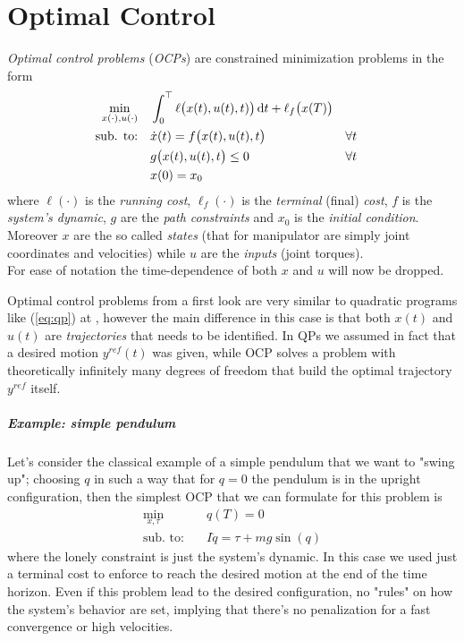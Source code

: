 \chapter{Optimal Control}
	\textit{Optimal control problems} (\textit{OCPs}) are constrained minimization problems in the form
	\begin{equation} \label{eq:ocpstatement}
	\begin{aligned}
		\min_{x(\cdot), u(\cdot)} \quad & \int_0^\top  \ell\big(x(t), u(t), t)\big) \, \mathrm{d} t + \ell_f\big(x(T)\big) \\
		\textrm{sub. to:} \quad & \dot x(t) = f\big(x(t), u(t), t\big) && \forall t \\
		& g\big(x(t), u(t), t\big) \leq 0 && \forall t \\
		& x(0) = x_0 
	\end{aligned}
	\end{equation}
	where $\ell(\cdot)$ is the \textit{running cost}, $\ell_f(\cdot)$ is the \textit{terminal} (final) \textit{cost}, $f$ is the \textit{system's dynamic}, $g$ are the \textit{path constraints} and $x_0$ is the \textit{initial condition}. Moreover $x$ are the so called \textit{states} (that for manipulator are simply joint coordinates and velocities) while $u$ are the \textit{inputs} (joint torques). \\
	For ease of notation the time-dependence of both $x$ and $u$ will now be dropped.
	
	Optimal control problems from a first look are very similar to quadratic programs like (\ref{eq:qp}) at \pageref{eq:qp}, however the main difference in this case is that both $x(t)$ and $u(t)$ are \textit{trajectories} that needs to be identified. In QPs we assumed in fact that a desired motion $y^{ref} (t)$ was given, while OCP solves a problem with theoretically infinitely many degrees of freedom that build the optimal trajectory $y^{ref}$ itself.
	
	\paragraph{Example: simple pendulum} Let's consider the classical example of a simple pendulum that we want to "swing up"; choosing $q$ in such a way that for $q=0$ the pendulum is in the upright configuration, then the simplest OCP that we can formulate for this problem is
	\begin{align*}
		\min_{x,\tau} \quad & q(T) = 0 \\
		\textrm{sub. to:} \quad & I\ddot q = \tau + mg\sin(q)
	\end{align*}
	where the lonely constraint is just the system's dynamic. In this case we used just a terminal cost to enforce to reach the desired motion at the end of the time horizon. Even if this problem lead to the desired configuration, no "rules" on how the system's behavior are set, implying that there's no penalization for a fast convergence or high velocities.
	

